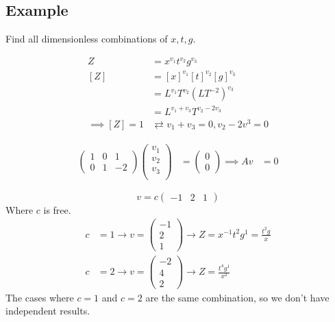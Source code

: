 \documentclass[12pt]{article}
\begin{document}
\subsection{Example}
Find all dimensionless combinations of $x, t, g$.

\begin{equation}
  \begin{aligned}
    Z &= x^{v_1}t^{v_2}g^{v_3} \\
    [Z] &= {[x]}^{v_1}{[t]}^{v_2}{[g]}^{v_3} \\
    &= L^{v_1}T^{v_2}{(LT^{-2})}^{v_3} \\
    &= L^{v_1+v_3} T^{v_2-2v_3} \\
    \implies [Z] = 1 & \rightleftarrows  v_1+v_3=0, v_2-2v^3=0
  \end{aligned}
\end{equation}

\begin{equation}
  \begin{aligned}
    \begin{pmatrix}
      1 & 0 & 1 \\
      0 & 1 & -2
    \end{pmatrix}
    \begin{pmatrix}
      v_1 \\ v_2 \\ v_3 \\
    \end{pmatrix}
    &=
    \begin{pmatrix}
      0 \\ 0
    \end{pmatrix}
    \implies Av &= 0
  \end{aligned}
\end{equation}

\begin{equation}
  v = c
  \begin{pmatrix}
    -1 & 2 & 1
  \end{pmatrix}
\end{equation}
Where $c$ is free.
\begin{equation}
  \begin{aligned}
    c &= 1 \rightarrow v =
    \begin{pmatrix}
      -1 \\ 2 \\ 1
    \end{pmatrix} \rightarrow
    Z = x^{-1} t^2 g^1 = \frac{t^2g}{x} \\
    c &= 2 \rightarrow v=
    \begin{pmatrix}
      -2 \\ 4 \\ 2
    \end{pmatrix} \rightarrow
    Z = \frac{t^4g^1}{x^2}
  \end{aligned}
\end{equation}
The cases where $c=1$ and $c=2$ are the same combination, so we don't have
independent results.
\end{document}
